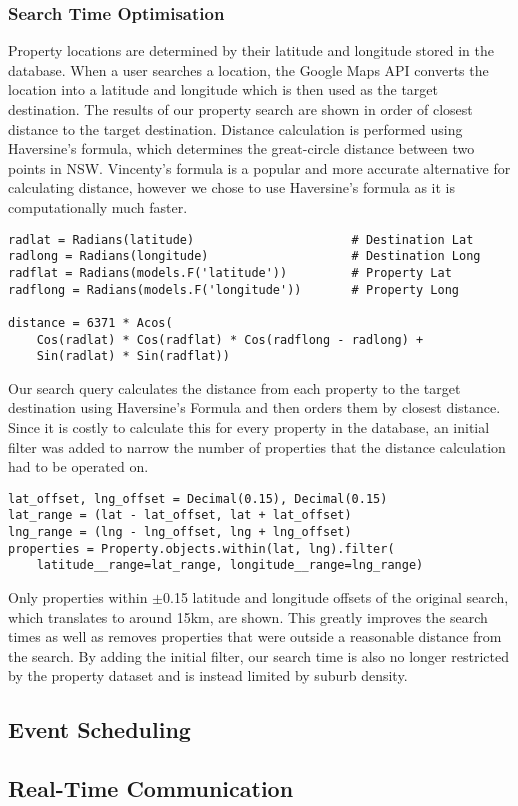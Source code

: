 \subsubsection{Search Time Optimisation}

Property locations are determined by their latitude and longitude stored in the
database. When a user searches a location, the Google Maps API converts the location
into a latitude and longitude which is then used as the target destination.
The results of our property search are shown in order of closest distance to the
target destination.
Distance calculation is performed using Haversine's formula, which determines the
great-circle distance between two points in NSW. Vincenty's formula is a popular and
more accurate alternative for calculating distance, however we chose to
use Haversine's formula as it is computationally much faster.

\begin{lstlisting}[caption={Haversine's Formula}]
radlat = Radians(latitude)                      # Destination Lat
radlong = Radians(longitude)                    # Destination Long
radflat = Radians(models.F('latitude'))	        # Property Lat
radflong = Radians(models.F('longitude'))       # Property Long

distance = 6371 * Acos(
    Cos(radlat) * Cos(radflat) * Cos(radflong - radlong) +
    Sin(radlat) * Sin(radflat))
\end{lstlisting}

Our search query calculates the distance from each property to the target
destination using Haversine's Formula and then orders them by closest distance.
Since it is costly to calculate this for every property in the database, an
initial filter was added to narrow the number of properties that the
distance calculation had to be operated on.

\begin{lstlisting}[caption={Initial filter to narrow search results}]
lat_offset, lng_offset = Decimal(0.15), Decimal(0.15)
lat_range = (lat - lat_offset, lat + lat_offset)
lng_range = (lng - lng_offset, lng + lng_offset)
properties = Property.objects.within(lat, lng).filter(
    latitude__range=lat_range, longitude__range=lng_range)
\end{lstlisting}

Only properties within $\pm$0.15 latitude and longitude offsets of the original
search, which translates to around 15km, are shown. This greatly improves the
search times as well as removes properties that were outside a reasonable distance
from the search. By adding the initial filter, our search time is also no longer
restricted by the property dataset and is instead limited by suburb density.

\subsection{Event Scheduling}

\subsection{Real-Time Communication}
